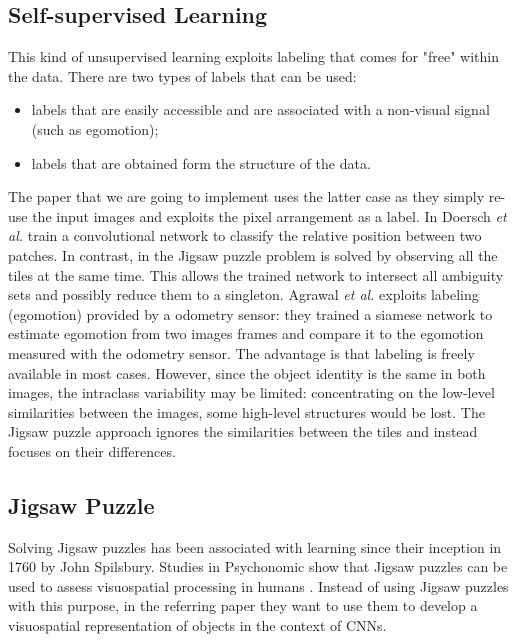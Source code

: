 \subsection{Self-supervised Learning}
This kind of unsupervised learning exploits labeling that comes for "free" within the data. There are two types of labels that can be used:
\begin{itemize}
    \item labels that are easily accessible and are associated with a non-visual signal (such as egomotion);
    \item labels that are obtained form the structure of the data.
\end{itemize}
The paper that we are going to implement uses the latter case as they simply re-use the input images and exploits the pixel arrangement as a label.\newline
In \cite{context_prediction} Doersch \textit{et al.} train a convolutional network to classify the relative position between two patches. In contrast, in \cite{Noroozi_2016} the Jigsaw puzzle problem is solved by observing all the tiles at the same time. This allows the trained network to intersect all ambiguity sets and possibly reduce them to a singleton.
Agrawal \textit{et al.} \cite{learning_by_moving} exploits labeling (egomotion) provided by a odometry sensor: they trained a siamese network to estimate egomotion from two images frames and compare it to the egomotion measured with the odometry sensor. The advantage is that labeling is freely available in most cases. However, since the object identity is the same in both images, the intraclass variability may be limited: concentrating on the low-level similarities between the images, some high-level structures would be lost. The Jigsaw puzzle approach ignores the similarities between the tiles and instead focuses on their differences.

\subsection{Jigsaw Puzzle}
Solving Jigsaw puzzles has been associated with learning since their inception in 1760 by John Spilsbury. Studies in Psychonomic show that Jigsaw puzzles can be used to assess visuospatial processing in humans \cite{assessing_visuospatial_processes}. Instead of using Jigsaw puzzles with this purpose, in the referring paper they want to use them to develop a visuospatial representation of objects in the context of CNNs.
